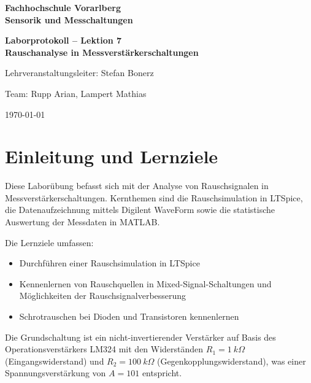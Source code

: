 \documentclass[12pt,a4paper]{article}
\begin{document}
\begin{titlepage}
  \centering
  \vspace*{2cm}
  {\Large\bfseries Fachhochschule Vorarlberg\\[0.5em]
   Sensorik und Messchaltungen\par}
  \vspace{1.5cm}
  {\LARGE\bfseries Laborprotokoll -- Lektion 7\\[0.4em]
   Rauschanalyse in Messverstärkerschaltungen\par}
  \vspace{2cm}
  {\large Lehrveranstaltungsleiter: Stefan Bonerz\par}
  \vspace{0.5cm}
  {\large Team: Rupp Arian, Lampert Mathias\par}
  \vfill
  {\large \today\par}
\end{titlepage}

\tableofcontents
\newpage

\section{Einleitung und Lernziele}

Diese Laborübung befasst sich mit der Analyse von Rauschsignalen in
Messverstärkerschaltungen. Kernthemen sind die Rauschsimulation in LTSpice,
die Datenaufzeichnung mittels Digilent WaveForm sowie die statistische
Auswertung der Messdaten in MATLAB.

Die Lernziele umfassen:
\begin{itemize}
  \item Durchführen einer Rauschsimulation in LTSpice
  \item Kennenlernen von Rauschquellen in Mixed-Signal-Schaltungen und
        Möglichkeiten der Rauschsignalverbesserung
  \item Schrotrauschen bei Dioden und Transistoren kennenlernen
\end{itemize}

Die Grundschaltung ist ein nicht-invertierender Verstärker auf Basis des
Operationsverstärkers LM324 mit den Widerständen $R_1 = \SI{1}{k\Omega}$
(Eingangswiderstand) und $R_2 = \SI{100}{k\Omega}$ (Gegenkopplungswiderstand),
was einer Spannungsverstärkung von $A = 101$ entspricht.
\end{document}
